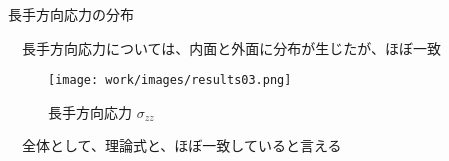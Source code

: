 \begin{frame}{長手方向応力の分布}
 
　長手方向応力については、内面と外面に分布が生じたが、ほぼ一致
\begin{figure}[htbp]
\centering
  \begin{minipage}{0.49\columnwidth}
     \centering
     \texttt{[image: work/images/results03.png]}
     \caption{長手方向応力
       \begin{math}
         σ_{zz}
       \end{math}
     }
  \end{minipage}
%
  \begin{minipage}{0.49\columnwidth}
  \end{minipage}
\end{figure}

　全体として、理論式と、ほぼ一致していると言える

\end{frame}
